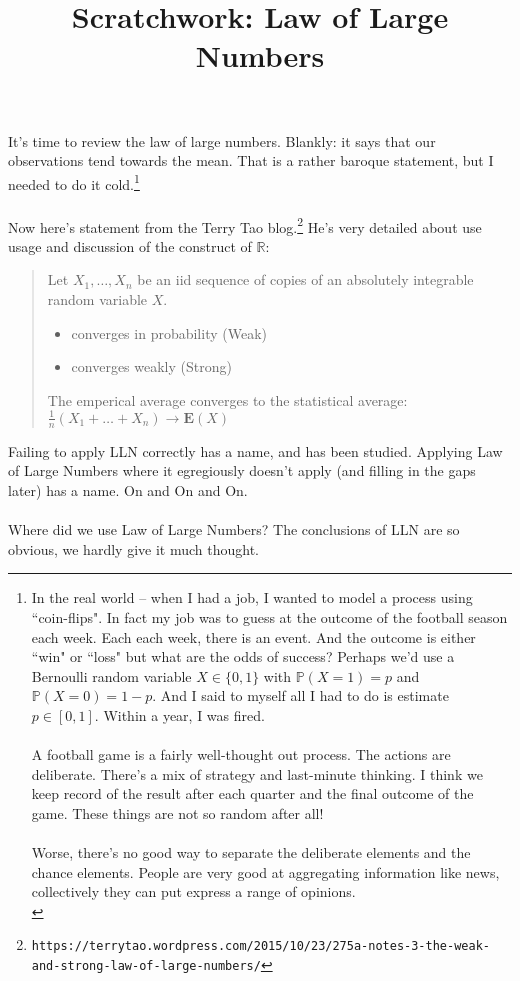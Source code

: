 \documentclass[12pt]{article}
\title{Scratchwork: Law of Large Numbers}
\date{}
\begin{document}

\sffamily

\maketitle

\noindent It's time to review the law of large numbers. Blankly: it says that our observations tend towards the mean.  That is a rather baroque statement, but I needed to do it cold.\footnote{
In the real world -- when I had a job, I wanted to model a process using ``coin-flips".  In fact my job was to guess at the outcome of the football season each week.  Each each week, there is an event.  And the outcome is either ``win" or ``loss" but what are the odds of success? Perhaps we'd use a Bernoulli random variable $X \in \{ 0,1\}$ with $\mathbb{P}(X=1) = p$ and $\mathbb{P}(X=0) = 1-p$.  And I said to myself all I had to do is estimate $p \in [0,1]$.  Within a year, I was fired. \\ \\
A football game is a fairly well-thought out process.  The actions are deliberate.  There's a mix of strategy and last-minute thinking.  I think we keep record of the result after each quarter and the final outcome of the game.  These things are not so random after all! \\ \\
Worse, there's no good way to separate the deliberate elements and the chance elements.  People are very good at aggregating information like news, collectively they can put express a range of opinions.\\} \\ \\
Now here's statement from the Terry Tao blog.\footnote{\texttt{https://terrytao.wordpress.com/2015/10/23/275a-notes-3-the-weak-and-strong-law-of-large-numbers/}}  He's very detailed about use usage and discussion of the construct of $\mathbb{R}$:
\begin{quotation}
\noindent Let $X_1, \dots, X_n$ be an iid sequence of copies of an absolutely integrable random variable $X$.  
\begin{itemize}
\item converges in probability (Weak)
\item converges weakly (Strong)
\end{itemize}
The emperical average converges to the statistical average: $\frac{1}{n}(X_1 + \dots + X_n) \to \mathbf{E}(X)$
\end{quotation}
Failing to apply LLN correctly has a name, and has been studied.  Applying Law of Large Numbers where it egregiously doesn't apply (and filling in the gaps later) has a name.  On and On and On. \\ \\
Where did we use Law of Large Numbers? The conclusions of LLN are so obvious, we hardly give it much thought.

\vfill

\begin{thebibliography}{}

\item 

\end{thebibliography}
\end{document}
